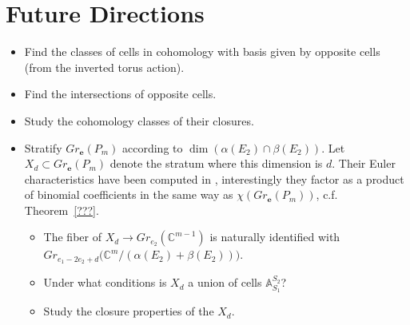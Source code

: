 \documentclass{amsart}
\numberwithin{equation}{section}
\renewcommand{\AA}{\mathbb{A}}
\newcommand{\CC}{\mathbb{C}}
\newcommand{\bfe}{\mathbf{e}}
\begin{document}
\section{Future Directions}
  \begin{itemize}
    \item Find the classes of cells in cohomology with basis given by opposite cells (from the inverted torus action).
    \item Find the intersections of opposite cells.
    \item Study the cohomology classes of their closures.
    \item Stratify $Gr_\bfe(P_m)$ according to $\dim(\alpha(E_2)\cap\beta(E_2))$.  
      Let $X_d\subset Gr_\bfe(P_m)$ denote the stratum where this dimension is $d$.
      Their Euler characteristics have been computed in \cite{cz}, interestingly they factor as a product of binomial coefficients in the same way as $\chi(Gr_\bfe(P_m))$, c.f. Theorem~\ref{???}.
      \begin{itemize}
        \item The fiber of $X_d\to Gr_{e_2}(\CC^{m-1})$ is naturally identified with $Gr_{e_1-2e_2+d}\big(\CC^m/(\alpha(E_2)+\beta(E_2))\big)$.
        \item Under what conditions is $X_d$ a union of cells $\AA_{S_1}^{S_2}$?
        \item Study the closure properties of the $X_d$.
      \end{itemize}
  \end{itemize}
\end{document}

